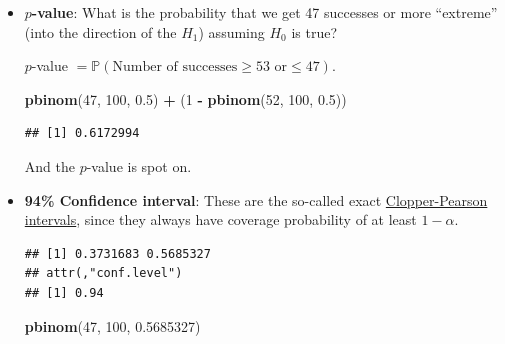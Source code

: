 \documentclass[
]{book}
\newenvironment{Shaded}{\begin{snugshade}}{\end{snugshade}}
\newcommand{\AttributeTok}[1]{\textcolor[rgb]{0.13,0.29,0.53}{#1}}
\newcommand{\DecValTok}[1]{\textcolor[rgb]{0.00,0.00,0.81}{#1}}
\newcommand{\FloatTok}[1]{\textcolor[rgb]{0.00,0.00,0.81}{#1}}
\newcommand{\FunctionTok}[1]{\textcolor[rgb]{0.13,0.29,0.53}{\textbf{#1}}}
\newcommand{\NormalTok}[1]{#1}
\newcommand{\SpecialCharTok}[1]{\textcolor[rgb]{0.81,0.36,0.00}{\textbf{#1}}}
\begin{document}
\begin{itemize}
\item
  \textbf{\(p\)-value}: What is the probability that we get 47 successes
  or more ``extreme'' (into the direction of the \(H_1\)) assuming \(H_0\) is true?

  \(p\)-value \(=\mathbb{P}(\text{Number of successes} \ge 53 \text{ or} \le 47)\).

\begin{Shaded}
\begin{Highlighting}[]
\FunctionTok{pbinom}\NormalTok{(}\DecValTok{47}\NormalTok{, }\DecValTok{100}\NormalTok{, }\FloatTok{0.5}\NormalTok{) }\SpecialCharTok{+}\NormalTok{ (}\DecValTok{1} \SpecialCharTok{{-}} \FunctionTok{pbinom}\NormalTok{(}\DecValTok{52}\NormalTok{, }\DecValTok{100}\NormalTok{, }\FloatTok{0.5}\NormalTok{))}
\end{Highlighting}
\end{Shaded}

\begin{verbatim}
## [1] 0.6172994
\end{verbatim}

  And the \(p\)-value is spot on.
\item
  \textbf{94\% Confidence interval}: These are the so-called exact \href{https://en.wikipedia.org/wiki/Binomial_proportion_confidence_interval\#Clopper\%E2\%80\%93Pearson_interval}{Clopper-Pearson intervals},
  since they always have coverage probability of at least \(1 - \alpha\).

\begin{Shaded}
\end{Shaded}

\begin{verbatim}
## [1] 0.3731683 0.5685327
## attr(,"conf.level")
## [1] 0.94
\end{verbatim}

\begin{Shaded}
\begin{Highlighting}[]
\FunctionTok{pbinom}\NormalTok{(}\DecValTok{47}\NormalTok{, }\DecValTok{100}\NormalTok{, }\FloatTok{0.5685327}\NormalTok{)}
\end{Highlighting}
\end{Shaded}


\end{itemize}
\end{document}
